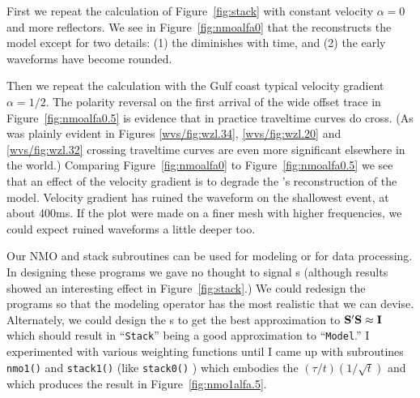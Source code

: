 First we repeat the calculation of Figure~\ref{fig:stack}
with constant velocity $\alpha=0$ and more reflectors.
We see in Figure~\ref{fig:nmoalfa0} that the  reconstructs
the model except for two details:
(1) the  diminishes with time, and 
(2) the early waveforms have become rounded.


Then we repeat the calculation
with the Gulf coast typical velocity gradient $\alpha=1/2$.
The polarity reversal on the first arrival of the wide offset trace
in Figure~\ref{fig:nmoalfa0.5}
is evidence that in practice traveltime curves do cross.
(As was plainly evident in Figures
\ref{wvs/fig:wzl.34},
\ref{wvs/fig:wzl.20} and
\ref{wvs/fig:wzl.32}
crossing traveltime curves are even more significant elsewhere in the world.)
Comparing Figure~\ref{fig:nmoalfa0} to Figure~\ref{fig:nmoalfa0.5}
we see that an effect of the velocity gradient
is to degrade the 's reconstruction of the model.
Velocity gradient has ruined the waveform on the shallowest event,
at about 400ms.
If the plot were made on a finer mesh
with higher frequencies,
we could expect ruined waveforms a little deeper too.


\par
Our NMO and stack subroutines can be used for modeling or for data processing.
In designing these programs we gave no thought to signal s
(although results showed an interesting  effect in Figure~\ref{fig:stack}.)
We could redesign the programs so that the modeling operator has the
most realistic  that we can devise.
Alternately, we could design the s
to get the best approximation to
$\bold S'\bold S\approx \bold I$
which should result in ``{\tt Stack}''
being a good approximation to ``{\tt Model}.''
I experimented with various weighting functions until
I came up with
subroutines \texttt{nmo1()} 
and {\tt stack1()} (like \texttt{stack0()} )
which embodies the  $(\tau/t)(1/\sqrt{t})$
and which produces the result in Figure~\ref{fig:nmo1alfa.5}.

